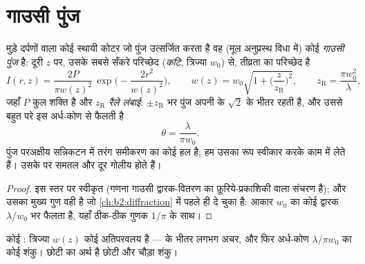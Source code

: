 \section{गाउसी पुंज}

\begin{proposition}[गाउसी पुंज]\label{prop:b2:laser:gaussian}
मुड़े दर्पणों वाला कोई स्थायी कोटर जो पुंज उत्सर्जित करता है वह (मूल
अनुप्रस्थ विधा में) कोई \emph{गाउसी पुंज} है: दूरी $z$ पर, उसके सबसे सँकरे परिच्छेद (\emph{कटि},
त्रिज्या $w_0$) से, तीव्रता का
परिच्छेद है
\[
I(r,z) = \frac{2P}{\pi w(z)^2}\,\exp\Big(-\frac{2r^2}{w(z)^2}\Big),
\qquad
w(z) = w_0\sqrt{1 + \Big(\frac{z}{z_{\text{R}}}\Big)^2},
\qquad
z_{\text{R}} = \frac{\pi w_0^2}{\lambda},
\]
जहाँ $P$ कुल शक्ति है और $z_{\text{R}}$ \emph{रैले
लंबाई}: $\pm z_{\text{R}}$ भर पुंज अपनी  के
$\sqrt2$ के भीतर रहती है, और उससे बहुत परे इस अर्ध-कोण से
फैलती है
\[
\theta = \frac{\lambda}{\pi w_0} .
\]
पुंज परअक्षीय सन्निकटन में तरंग समीकरण का कोई
हल है; हम उसका रूप स्वीकार करके काम में लेते हैं। उसके   पर समतल
और दूर गोलीय होते हैं।
\end{proposition}

\begin{proof}
इस स्तर पर स्वीकृत (गणना गाउसी द्वारक-वितरण का फ़ूरिये-प्रकाशिकी वाला
संचरण है); और उसका मुख्य गुण वही है जो
\cref{ch:b2:diffraction} में  पहले ही दे चुका है: आकार $w_0$ का कोई
द्वारक $\lambda/w_0$ भर फैलता है, यहाँ ठीक-ठीक
गुणक $1/\pi$ के साथ।
\end{proof}

\begin{omfigure}

{\small कोई : त्रिज्या $w(z)$ कोई अतिपरवलय है ---  के
भीतर लगभग अचर, और फिर अर्ध-कोण
$\lambda/\pi w_0$ का कोई शंकु। छोटी  का अर्थ है छोटी  और
चौड़ा शंकु।}
\end{omfigure}

